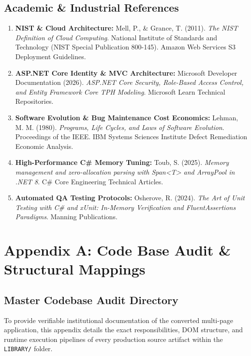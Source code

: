 \documentclass[11pt,a4paper]{report}
\begin{document}
\section{Academic \& Industrial References}
\begin{enumerate}[leftmargin=1.5em]
    \item \textbf{NIST \& Cloud Architecture:} Mell, P., \& Grance, T. (2011). \textit{The NIST Definition of Cloud Computing}. National Institute of Standards and Technology (NIST Special Publication 800-145). Amazon Web Services S3 Deployment Guidelines.
    \item \textbf{ASP.NET Core Identity \& MVC Architecture:} Microsoft Developer Documentation (2026). \textit{ASP.NET Core Security, Role-Based Access Control, and Entity Framework Core TPH Modeling}. Microsoft Learn Technical Repositories.
    \item \textbf{Software Evolution \& Bug Maintenance Cost Economics:} Lehman, M. M. (1980). \textit{Programs, Life Cycles, and Laws of Software Evolution}. Proceedings of the IEEE. IBM Systems Sciences Institute Defect Remediation Economic Analysis.
    \item \textbf{High-Performance C\# Memory Tuning:} Toub, S. (2025). \textit{Memory management and zero-allocation parsing with Span<T> and ArrayPool in .NET 8}. C\# Core Engineering Technical Articles.
    \item \textbf{Automated QA Testing Protocols:} Osherove, R. (2024). \textit{The Art of Unit Testing with C\# and xUnit: In-Memory Verification and FluentAssertions Paradigms}. Manning Publications.
\end{enumerate}

\newpage

\chapter{Appendix A: Code Base Audit \& Structural Mappings}

\section{Master Codebase Audit Directory}
To provide verifiable institutional documentation of the converted multi-page application, this appendix details the exact responsibilities, DOM structure, and runtime execution pipelines of every production source artifact within the \texttt{LIBRARY/} folder.
\end{document}
